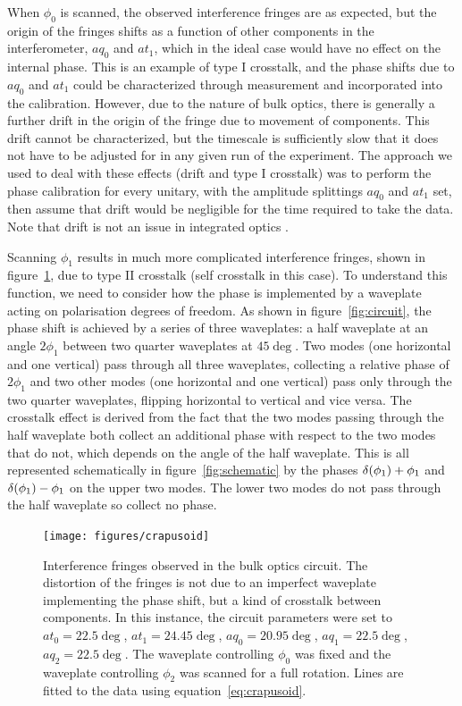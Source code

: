 When \(\phi_{0}\) is scanned, the observed interference fringes are as expected,
but the origin of the fringes shifts as a function of other components in the
interferometer, \(aq_{0}\) and \(at_{1}\), which in the ideal case would have no
effect on the internal phase. This is an example of type I crosstalk, and the
phase shifts due to \(aq_{0}\) and \(at_{1}\) could be characterized through
measurement and incorporated into the calibration. However, due to the nature of
bulk optics, there is generally a further drift in the origin of the fringe due
to movement of components. This drift cannot be characterized, but the timescale
is sufficiently slow that it does not have to be adjusted for in any given run
of the experiment. The approach we used to deal with these effects (drift and
type I crosstalk) was to perform the phase calibration for every unitary, with
the amplitude splittings \(aq_{0}\) and \(at_{1}\) set, then assume that drift
would be negligible for the time required to take the data. Note that drift is
not an issue in integrated optics \cite{politi-ic}.

Scanning \(\phi_{1}\) results in much more complicated interference fringes,
shown in figure~\ref{fig:crapusoid}, due to type II crosstalk (self crosstalk in
this case). To understand this function, we need to consider how the phase is
implemented by a waveplate acting on polarisation degrees of freedom. As shown
in figure~\ref{fig:circuit}, the phase shift is achieved by a series of three
waveplates: a half waveplate at an angle \(2\phi_{1}\) between two quarter
waveplates at \(45\deg\). Two modes (one horizontal and one vertical) pass
through all three waveplates, collecting a relative phase of \(2\phi_{1}\) and
two other modes (one horizontal and one vertical) pass only through the two
quarter waveplates, flipping horizontal to vertical and vice versa. The
crosstalk effect is derived from the fact that the two modes passing through the
half waveplate both collect an additional phase with respect to the two modes
that do not, which depends on the angle of the half waveplate. This is all
represented schematically in figure~\ref{fig:schematic} by the phases \(\delta
\!\left(\phi_{1}\right) + \phi_{1}\) and \(\delta \!\left(\phi_{1}\right) - \phi_{1}\) on the upper
two modes. The lower two modes do not pass through the half waveplate so collect
no phase.

\begin{figure}[h]
  \centering
  \texttt{[image: figures/crapusoid]}
  \caption[Interference fringes distorted by crosstalk between components]
  {Interference fringes observed in the bulk optics circuit. The distortion of
  the fringes is not due to an imperfect waveplate implementing the phase shift,
  but a kind of crosstalk between components. In this instance, the circuit
  parameters were set to \(at_{0}=22.5\deg\), \(at_{1}=24.45\deg\),
  \(aq_{0}=20.95\deg\), \(aq_{1}=22.5\deg\), \(aq_{2}=22.5\deg\). The waveplate
  controlling \(\phi_{0}\) was fixed and the waveplate controlling \(\phi_{2}\)
  was scanned for a full rotation. Lines are fitted to the data using
  equation~\ref{eq:crapusoid}.}
  \label{fig:crapusoid}
\end{figure}

